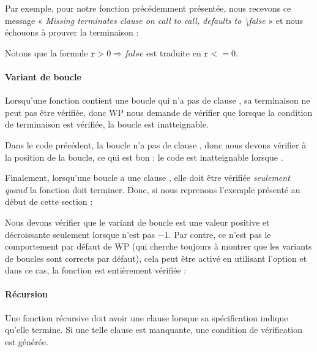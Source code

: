 Par exemple, pour notre fonction  précédemment présentée,
nous recevons ce message
« \textit{Missing terminates clause on call to call, defaults to \textbackslash{}false} »
et nous échouons à prouver la terminaison :




Notons que la formule $\mathtt{r} > 0 \Rightarrow false$ est traduite en
$\mathtt{r} <= 0$.



\paragraph{Variant de boucle}


Lorsqu'une fonction contient une boucle qui n'a pas de clause
, sa terminaison ne peut pas être vérifiée, donc WP
nous demande de vérifier que lorsque la condition de terminaison est vérifiée,
la boucle est inatteignable.




Dans le code précédent, la boucle n'a pas de clause ,
donc nous devons vérifier  à
la position de la boucle, ce qui est bon : le code est inatteignable lorsque
.


Finalement, lorsqu'une boucle a une clause , elle doit
être vérifiée \textit{seulement quand} la fonction doit terminer. Donc, si nous
reprenons l'exemple présenté au début de cette section :




Nous devons vérifier que le variant de boucle est une valeur positive et
décroissante seulement lorsque  n'est pas $-1$. Par
contre, ce n'est pas le comportement par défaut de WP (qui cherche toujours à
montrer que les variants de boucles sont corrects par défaut), cela peut être
activé en utilisant l'option  et dans
ce cas, la fonction est entièrement vérifiée :




\paragraph{Récursion}


Une fonction récursive doit avoir une clause  lorsque sa
spécification indique qu'elle termine. Si une telle clause est manquante, une
condition de vérification  est générée.


